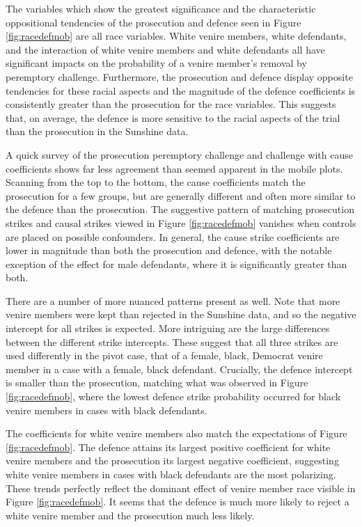 \documentclass[12pt]{article}
\begin{document}
The variables which show the greatest significance and the characteristic oppositional tendencies of the prosecution and defence seen in Figure \ref{fig:racedefmob} are all race variables. White venire members, white defendants, and the interaction of white venire members and white defendants all have significant impacts on the probability of a venire member's removal by peremptory challenge. Furthermore, the prosecution and defence display opposite tendencies for these racial aspects and the magnitude of the defence coefficients is consistently greater than the prosecution for the race variables. This suggests that, on average, the defence is more sensitive to the racial aspects of the trial than the prosecution in the Sunshine data.

A quick survey of the prosecution peremptory challenge and challenge with cause coefficients shows far less agreement than seemed apparent in the mobile plots. Scanning from the top to the bottom, the cause coefficients match the prosecution for a few groups, but are generally different and often more similar to the defence than the prosecution. The suggestive pattern of matching prosecution strikes and causal strikes viewed in Figure \ref{fig:racedefmob} vanishes when controls are placed on possible confounders. In general, the cause strike coefficients are lower in magnitude than both the prosecution and defence, with the notable exception of the effect for male defendants, where it is significantly greater than both.

There are a number of more nuanced patterns present as well. Note that more venire members were kept than rejected in the Sunshine data, and so the negative intercept for all strikes is expected. More intriguing are the large differences between the different strike intercepts. These suggest that all three strikes are used differently in the pivot case, that of a female, black, Democrat venire member in a case with a female, black defendant. Crucially, the defence intercept is smaller than the prosecution, matching what was observed in Figure \ref{fig:racedefmob}, where the lowest defence strike probability occurred for black venire members in cases with black defendants. 

The coefficients for white venire members also match the expectations of Figure \ref{fig:racedefmob}. The defence attains its largest positive coefficient for white venire members and the prosecution its largest negative coefficient, suggesting white venire members in cases with black defendants are the most polarizing. These trends perfectly reflect the dominant effect of venire member race visible in Figure \ref{fig:racedefmob}. It seems that the defence is much more likely to reject a white venire member and the prosecution much less likely.
\end{document}
